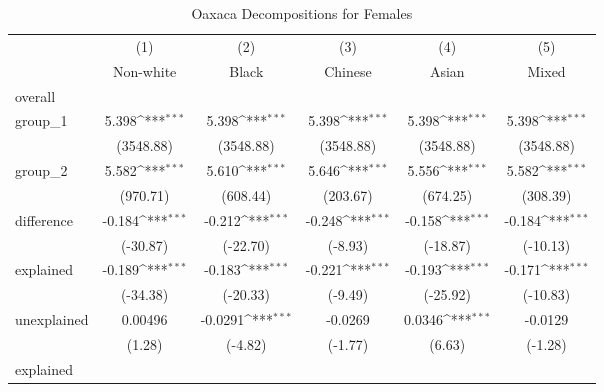 \begin{table}[htbp]\centering
\def\sym#1{\ifmmode^{#1}\else\(^{#1}\)\fi}
\caption{Oaxaca Decompositions for Females\label{tab1}}
\begin{tabular}{l*{5}{c}}
\hline\hline
            &\multicolumn{1}{c}{(1)}&\multicolumn{1}{c}{(2)}&\multicolumn{1}{c}{(3)}&\multicolumn{1}{c}{(4)}&\multicolumn{1}{c}{(5)}\\
            &\multicolumn{1}{c}{Non-white}&\multicolumn{1}{c}{Black}&\multicolumn{1}{c}{Chinese}&\multicolumn{1}{c}{Asian}&\multicolumn{1}{c}{Mixed}\\
\hline
overall     &                     &                     &                     &                     &                     \\
group\_1     &       5.398\sym{***}&       5.398\sym{***}&       5.398\sym{***}&       5.398\sym{***}&       5.398\sym{***}\\
            &   (3548.88)         &   (3548.88)         &   (3548.88)         &   (3548.88)         &   (3548.88)         \\
group\_2     &       5.582\sym{***}&       5.610\sym{***}&       5.646\sym{***}&       5.556\sym{***}&       5.582\sym{***}\\
            &    (970.71)         &    (608.44)         &    (203.67)         &    (674.25)         &    (308.39)         \\
difference  &      -0.184\sym{***}&      -0.212\sym{***}&      -0.248\sym{***}&      -0.158\sym{***}&      -0.184\sym{***}\\
            &    (-30.87)         &    (-22.70)         &     (-8.93)         &    (-18.87)         &    (-10.13)         \\
explained   &      -0.189\sym{***}&      -0.183\sym{***}&      -0.221\sym{***}&      -0.193\sym{***}&      -0.171\sym{***}\\
            &    (-34.38)         &    (-20.33)         &     (-9.49)         &    (-25.92)         &    (-10.83)         \\
unexplained &     0.00496         &     -0.0291\sym{***}&     -0.0269         &      0.0346\sym{***}&     -0.0129         \\
            &      (1.28)         &     (-4.82)         &     (-1.77)         &      (6.63)         &     (-1.28)         \\
\hline
explained   &                     &                     &                     &                     &                     \\

\end{tabular}
\end{table}
